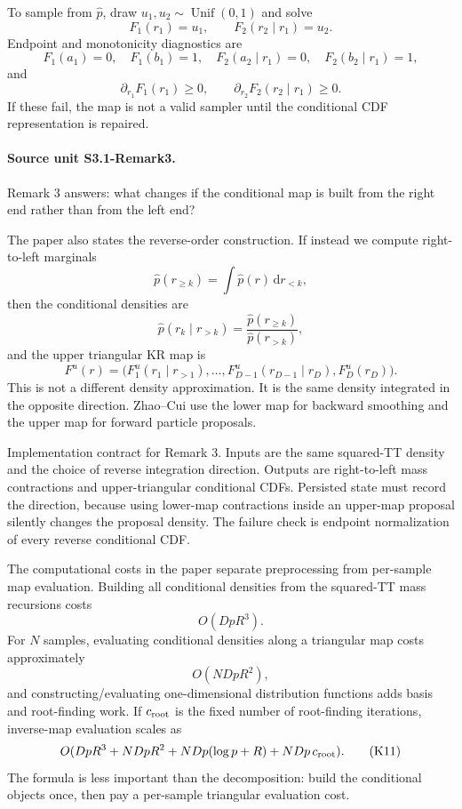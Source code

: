 \documentclass[11pt]{article}
\newcommand{\dd}{\,\mathrm d}
\begin{document}
To sample from \(\widehat p\), draw \(u_1,u_2\sim\operatorname{Unif}(0,1)\)
and solve
\[
    F_1(r_1)=u_1,
    \qquad
    F_2(r_2\mid r_1)=u_2.
    \tag{P23-KR2-9}
\]
Endpoint and monotonicity diagnostics are
\[
    F_1(a_1)=0,\quad F_1(b_1)=1,\quad
    F_2(a_2\mid r_1)=0,\quad F_2(b_2\mid r_1)=1,
    \tag{P23-KR2-10}
\]
and
\[
    \partial_{r_1}F_1(r_1)\ge0,
    \qquad
    \partial_{r_2}F_2(r_2\mid r_1)\ge0.
    \tag{P23-KR2-11}
\]
If these fail, the map is not a valid sampler until the conditional CDF
representation is repaired.

\paragraph{Source unit S3.1-Remark3.}
Remark 3 answers: what changes if the conditional map is built from the right
end rather than from the left end?

The paper also states the reverse-order construction.  If instead we compute
right-to-left marginals
\[
    \widehat p(r_{\ge k})
    =
    \int \widehat p(r)\dd r_{<k},
    \tag{K6}
\]
then the conditional densities are
\[
    \widehat p(r_k\mid r_{>k})
    =
    \frac{\widehat p(r_{\ge k})}{\widehat p(r_{>k})},
    \tag{K7}
\]
and the upper triangular KR map is
\[
    F^u(r)
    =
    \bigl(
    F^u_1(r_1\mid r_{>1}),\ldots,
    F^u_{D-1}(r_{D-1}\mid r_D),F^u_D(r_D)
    \bigr).
    \tag{K8}
\]
This is not a different density approximation.  It is the same density
integrated in the opposite direction.  Zhao--Cui use the lower map for
backward smoothing and the upper map for forward particle proposals.

Implementation contract for Remark 3.  Inputs are the same squared-TT density
and the choice of reverse integration direction.  Outputs are right-to-left
mass contractions and upper-triangular conditional CDFs.  Persisted state must
record the direction, because using lower-map contractions inside an upper-map
proposal silently changes the proposal density.  The failure check is endpoint
normalization of every reverse conditional CDF.

The computational costs in the paper separate preprocessing from per-sample
map evaluation.  Building all conditional densities from the squared-TT mass
recursions costs
\[
    O(DpR^3).
    \tag{K9}
\]
For \(N\) samples, evaluating conditional densities along a triangular map
costs approximately
\[
    O(NDpR^2),
    \tag{K10}
\]
and constructing/evaluating one-dimensional distribution functions adds basis
and root-finding work.  If \(c_{\rm root}\) is the fixed number of root-finding
iterations, inverse-map evaluation scales as
\[
    O(DpR^3+NDpR^2+NDp(\log p+R)+NDp\,c_{\rm root}).
    \tag{K11}
\]
The formula is less important than the decomposition: build the conditional
objects once, then pay a per-sample triangular evaluation cost.
\end{document}
